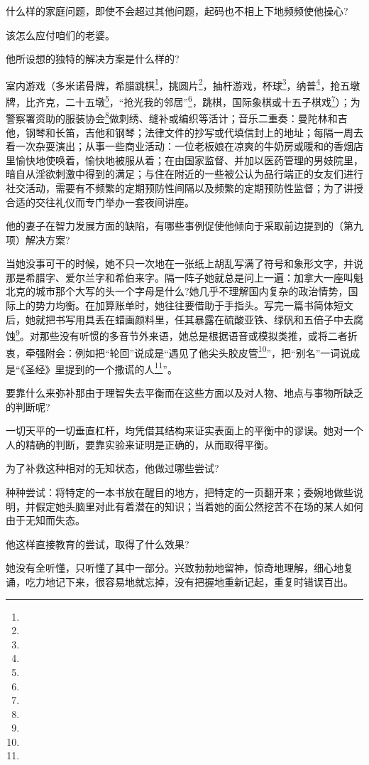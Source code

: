 \par 什么样的家庭问题，即使不会超过其他问题，起码也不相上下地频频使他操心?
\par 该怎么应付咱们的老婆。
\par 他所设想的独特的解决方案是什么样的?
\par 室内游戏（多米诺骨牌，希腊跳棋\footnote{}，挑圆片\footnote{}，抽杆游戏，杯球\footnote{}，纳普\footnote{}，抢五墩牌，比齐克，二十五墩\footnote{}，“抢光我的邻居”\footnote{}，跳棋，国际象棋或十五子棋戏\footnote{}）；为警察署资助的服装协会\footnote{}做刺绣、缝补或编织等活计；音乐二重奏：曼陀林和吉他，钢琴和长笛，吉他和钢琴；法律文件的抄写或代填信封上的地址；每隔一周去看一次杂耍演出；从事一些商业活动：一位老板娘在凉爽的牛奶房或暖和的香烟店里愉快地使唤着，愉快地被服从着；在由国家监督、并加以医药管理的男妓院里，暗自从淫欲刺激中得到的满足；与住在附近的一些被公认为品行端正的女友们进行社交活动，需要有不频繁的定期预防性间隔以及频繁的定期预防性监督；为了讲授合适的交往礼仪而专门举办一套夜间讲座。
\par 他的妻子在智力发展方面的缺陷，有哪些事例促使他倾向于采取前边提到的（第九项）解决方案?
\par 当她没事可干的时候，她不只一次地在一张纸上胡乱写满了符号和象形文字，并说那是希腊字、爱尔兰字和希伯来字。隔一阵子她就总是问上一遍：加拿大一座叫魁北克的城市那个大写的头一个字母是什么?她几乎不理解国内复杂的政治情势，国际上的势力均衡。在加算账单时，她往往要借助于手指头。写完一篇书简体短文后，她就把书写用具丢在蜡画颜料里，任其暴露在硫酸亚铁、绿矾和五倍子中去腐蚀\footnote{}。对那些没有听惯的多音节外来语，她总是根据语音或模拟类推，或将二者折衷，牵强附会：例如把“轮回”说成是“遇见了他尖头胶皮管\footnote{}”，把“别名”一词说成是“《圣经》里提到的一个撒谎的人\footnote{}”。
\par 要靠什么来弥补那由于理智失去平衡而在这些方面以及对人物、地点与事物所缺乏的判断呢?
\par 一切天平的一切垂直杠杆，均凭借其结构来证实表面上的平衡中的谬误。她对一个人的精确的判断，要靠实验来证明是正确的，从而取得平衡。
\par 为了补救这种相对的无知状态，他做过哪些尝试?
\par 种种尝试：将特定的一本书放在醒目的地方，把特定的一页翻开来；委婉地做些说明，并假定她头脑里对此有着潜在的知识；当着她的面公然挖苦不在场的某人如何由于无知而失态。
\par 他这样直接教育的尝试，取得了什么效果?
\par 她没有全听懂，只听懂了其中一部分。兴致勃勃地留神，惊奇地理解，细心地复诵，吃力地记下来，很容易地就忘掉，没有把握地重新记起，重复时错误百出。
